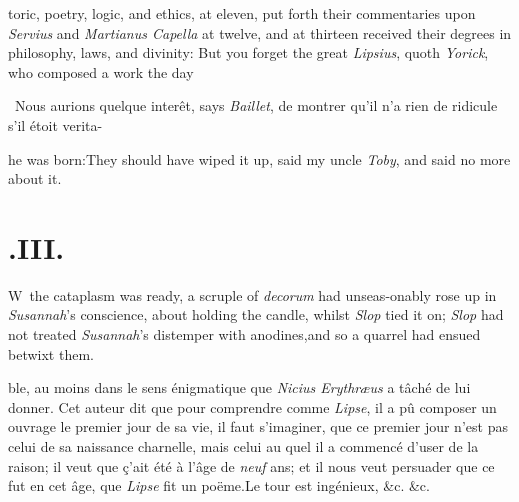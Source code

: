 \documentclass{article}
\begin{document}
toric, poetry, logic, and ethics, at eleven,\break
\tsk put forth their commentaries upon\break
\textit{Servius} and \textit{Martianus Capella} at twelve,\break
\tsk and at thirteen received their degrees in
philosophy, laws, and divinity:\tsh\break
But you forget the great \textit{Lipsius}, quoth
\textit{Yorick}, who composed a work \lower -2pt\hbox{\ast} the day\break

\vfill
\bgroup\footnotesize
\indent\lower -2pt\hbox{\ast}\ Nous aurions quelque interêt, says
\textit{Baillet}, de montrer qu’il n’a rien de ridicule s’il étoit verita-
\par\egroup

\newpage\noindent
he was born:\tsh They should have wiped it up, said my uncle
\textit{Toby}, and said no more about it.

\section{.\enspace III.}

\lettrine{W}{\,} the cataplasm was ready, a\break
scruple of \textit{decorum} had unseas-\break onably rose up in
\textit{Susannah}’s conscience, about holding the candle,
whilst \textit{Slop} tied it on; \textit{Slop} had not treated
\textit{Susannah}’s distemper with anodines,\tsk and so a
quarrel had ensued betwixt them.

\vfill
\bgroup\footnotesize
\noindent
ble, au
moins dans le sens énigmatique que \textit{Nicius Erythræus} a tâché de lui donner.
Cet auteur dit que pour comprendre comme \textit{Lipse}, il a pû composer un ouvrage
le premier jour de sa vie, il faut s’imaginer, que ce premier jour n’est pas celui
de sa naissance charnelle, mais celui au quel il a commencé d’user de la raison; il
veut que ç’ait été à l’âge de \textit{neuf} ans; et il nous veut persuader que ce
fut en cet âge, que \textit{Lipse} fit un poëme.\tsh Le tour est ingénieux, \&c.
\&c.\par\egroup
\end{document}
